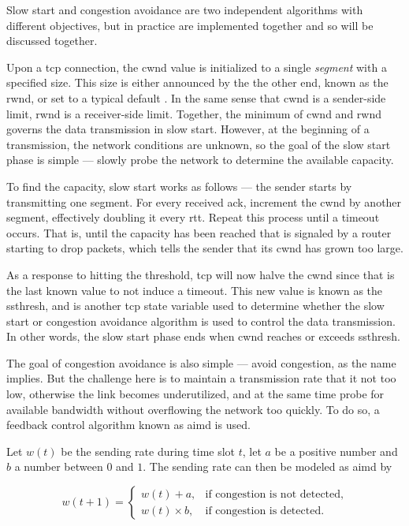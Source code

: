 Slow start and congestion avoidance are two independent algorithms with different objectives, but in practice are implemented together and so will be discussed together.

Upon a \gls{tcp} connection, the \gls{cwnd} value is initialized to a single \textit{segment} with a specified size. This size is either  announced by the the other end, known as the \gls{rwnd}, or set to a typical default \cite{rfc5681}. In the same sense that \gls{cwnd} is a sender-side limit, \gls{rwnd} is a receiver-side limit. Together, the minimum of \gls{cwnd} and \gls{rwnd} governs the data transmission in slow start. However, at the beginning of a transmission, the network conditions are unknown, so the goal of the slow start phase is simple --- slowly probe the network to determine the available capacity.

To find the capacity, slow start works as follows --- the sender starts by transmitting one segment. For every received \gls{ack}, increment the \gls{cwnd} by another segment, effectively doubling it every \gls{rtt}. Repeat this process until a timeout occurs. That is, until the capacity has been reached that is signaled by a router starting to drop packets, which tells the sender that its \gls{cwnd} has grown too large.

As a response to hitting the threshold, \gls{tcp} will now halve the \gls{cwnd} since that is the last known value to not induce a timeout. This new value is known as the \gls{ssthresh}, and is another \gls{tcp} state variable used to determine whether the slow start or congestion avoidance algorithm is used to control the data transmission. In other words, the slow start phase ends when \gls{cwnd} reaches or exceeds \gls{ssthresh}.

The goal of congestion avoidance is also simple --- avoid congestion, as the name implies. But the challenge here is to maintain a transmission rate that it not too low, otherwise the link becomes underutilized, and at the same time probe for available bandwidth without overflowing the network too quickly. To do so, a feedback control algorithm known as \gls{aimd} is used.

Let $w(t)$ be the sending rate during time slot $t$, let $a$ be a positive number and $b$ a number between $0$ and $1$. The sending rate can then be modeled as \gls{aimd} by

\begin{equation} \label{eq:aimd}
    w(t + 1) = \begin{cases}
        w(t) + a, & \text{if congestion is not detected},\\
        w(t) \times b, & \text{if congestion is detected}.
    \end{cases}
\end{equation}

